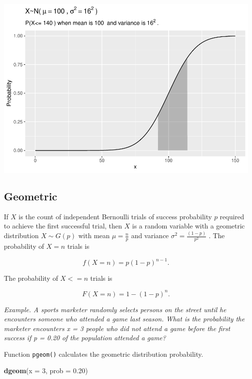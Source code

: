 \documentclass[
]{book}
\newenvironment{Shaded}{\begin{snugshade}}{\end{snugshade}}
\newcommand{\DataTypeTok}[1]{\textcolor[rgb]{0.13,0.29,0.53}{#1}}
\newcommand{\DecValTok}[1]{\textcolor[rgb]{0.00,0.00,0.81}{#1}}
\newcommand{\FloatTok}[1]{\textcolor[rgb]{0.00,0.00,0.81}{#1}}
\newcommand{\KeywordTok}[1]{\textcolor[rgb]{0.13,0.29,0.53}{\textbf{#1}}}
\newcommand{\NormalTok}[1]{#1}
\begin{document}
\includegraphics{data-sci_files/figure-latex/unnamed-chunk-15-1.pdf}

\hypertarget{geometric}{%
\subsection{Geometric}\label{geometric}}

If \(X\) is the count of independent Bernoulli trials of success probability \(p\) required to achieve the first successful trial, then \(X\) is a random variable with a geometric distribution \(X \sim G(p)\) with mean \(\mu=\frac{{n}}{{p}}\) and variance \(\sigma^2 = \frac{(1-p)}{p^2}\) . The probability of \(X=n\) trials is

\[f(X=n) = p(1-p)^{n-1}.\]

The probability of \(X<=n\) trials is

\[F(X=n) = 1 - (1-p)^n.\]

\emph{Example. A sports marketer randomly selects persons on the street until he encounters someone who attended a game last season. What is the probability the marketer encounters x = 3 people who did not attend a game before the first success if p = 0.20 of the population attended a game?}

Function \texttt{pgeom()} calculates the geometric distribution probability.

\begin{Shaded}
\begin{Highlighting}[]
\KeywordTok{dgeom}\NormalTok{(}\DataTypeTok{x =} \DecValTok{3}\NormalTok{, }\DataTypeTok{prob =} \FloatTok{0.20}\NormalTok{)}
\end{Highlighting}
\end{Shaded}
\end{document}
